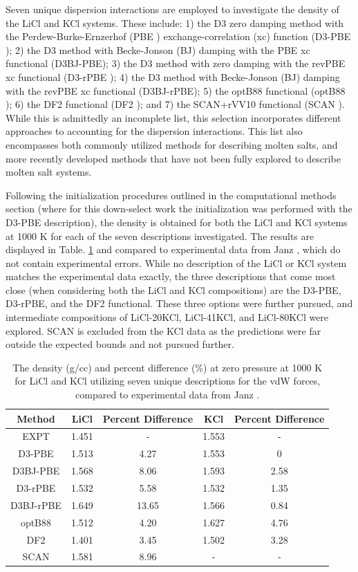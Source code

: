 \documentclass[review]{elsarticle}
\begin{document}
Seven unique dispersion interactions are employed to investigate the density of the LiCl and KCl systems. These include: 1) the D3 zero damping method with the Perdew-Burke-Ernzerhof (PBE \cite{perdew1996}) exchange-correlation (xc) function (D3-PBE \cite{Grimme2010}); 2) the D3 method with Becke-Jonson (BJ) damping with the PBE xc functional (D3BJ-PBE); 3) the D3 method with zero damping with the revPBE xc functional (D3-rPBE \cite{zhang1998}); 4) the D3 method with Becke-Jonson (BJ) damping with the revPBE xc functional (D3BJ-rPBE); 5) the optB88 functional (optB88 \cite{klimevs2009chemical}); 6) the DF2 functional (DF2 \cite{lee2010}); and 7) the SCAN+rVV10 functional (SCAN \cite{peng2016}). While this is admittedly an incomplete list, this selection incorporates different approaches to accounting for the dispersion interactions. This list also encompasses both commonly utilized methods for describing molten salts, and more recently developed methods that have not been fully explored to describe molten salt systems. 

Following the initialization procedures outlined in the computational methods section (where for this down-select work the initialization was performed with the D3-PBE description), the density is obtained for both the LiCl and KCl systems at 1000 K for each of the seven descriptions investigated. The results are displayed in Table. \ref{tab:my_label} and compared to experimental data from Janz \cite{janz1975molten,van1955electrical}, which do not contain experimental errors. While no description of the LiCl or KCl system matches the experimental data exactly, the three descriptions that come most close (when considering both the LiCl and KCl compositions) are the D3-PBE, D3-rPBE, and the DF2 functional. These three options were further pursued, and intermediate compositions of LiCl-20KCl, LiCl-41KCl, and LiCl-80KCl were explored. SCAN is excluded from the KCl data as the predictions were far outside the expected bounds and not pursued further.
 

\begin{table}[]
    \centering
    \begin{tabular}{|c|c|c|c|c|}
\hline
Method	&	LiCl	& Percent Difference &	KCl & Percent Difference	\\
\hline
EXPT	&	1.451	& -&	1.553 &-	\\
D3-PBE	&	1.513	& 4.27&	1.553 & 0	\\
D3BJ-PBE	&	1.568 &	8.06&	1.593 & 2.58	\\
D3-rPBE	&	1.532	& 5.58&	1.532 & 1.35	\\
D3BJ-rPBE	&	1.649 &	13.65&	1.566 & 0.84	\\
optB88	&	1.512	& 4.20&	1.627 & 4.76	\\
DF2	&	1.401	& 3.45&	1.502 & 3.28	\\
SCAN & 1.581 & 8.96& -&- \\
\hline
    \end{tabular}
    \caption{The density (g/cc) and percent difference (\%) at zero pressure at 1000 K for LiCl and KCl utilizing seven unique descriptions for the vdW forces, compared to experimental data from Janz \cite{janz1975molten,van1955electrical}. }
    \label{tab:my_label}
\end{table}
\end{document}
